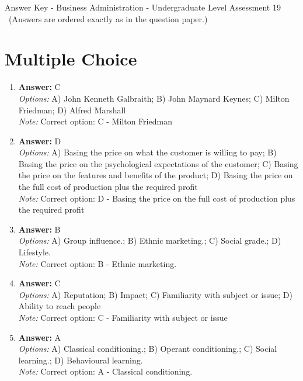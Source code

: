 \documentclass[12pt]{article}
\begin{document}
\begin{center}
Answer Key - Business Administration - Undergraduate Level Assessment 19 \
\small (Answers are ordered exactly as in the question paper.)
\end{center}

\section*{Multiple Choice}
\begin{enumerate}[label=\arabic*.]
\item \textbf{Answer:} C
\\ \textit{Options:} A) John Kenneth Galbraith; B) John Maynard Keynes; C) Milton Friedman; D) Alfred Marshall
\\ \textit{Note:} Correct option: C - Milton Friedman
\item \textbf{Answer:} D
\\ \textit{Options:} A) Basing the price on what the customer is willing to pay; B) Basing the price on the psychological expectations of the customer; C) Basing the price on the features and benefits of the product; D) Basing the price on the full cost of production plus the required profit
\\ \textit{Note:} Correct option: D - Basing the price on the full cost of production plus the required profit
\item \textbf{Answer:} B
\\ \textit{Options:} A) Group influence.; B) Ethnic marketing.; C) Social grade.; D) Lifestyle.
\\ \textit{Note:} Correct option: B - Ethnic marketing.
\item \textbf{Answer:} C
\\ \textit{Options:} A) Reputation; B) Impact; C) Familiarity with subject or issue; D) Ability to reach people
\\ \textit{Note:} Correct option: C - Familiarity with subject or issue
\item \textbf{Answer:} A
\\ \textit{Options:} A) Classical conditioning.; B) Operant conditioning.; C) Social learning.; D) Behavioural learning.
\\ \textit{Note:} Correct option: A - Classical conditioning.
\end{enumerate}
\end{document}
